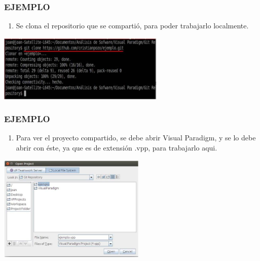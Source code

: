 \documentclass[8pt]{beamer}
\begin{document}
\begin{frame}
\frametitle{EJEMPLO}
\begin{enumerate}[19. ]
    \item Se clona el repositorio que se compartió, para poder trabajarlo localmente.\\
\end{enumerate}
\begin{center}
\includegraphics[width=8cm]{img/b30}\\
\fontsize{6}{1}
\end{center}
\end{frame}

\begin{frame}
\frametitle{EJEMPLO}
\begin{enumerate}[20. ]
	\justifying
    \item Para ver el proyecto compartido, se debe abrir Visual Paradigm, y se lo debe abrir con éste, ya que es de extensión .vpp, para trabajarlo aqui.\\
\end{enumerate}
\begin{center}
\includegraphics[width=7cm]{img/b31}\\
\fontsize{6}{1}
\end{center}
\end{frame}
\end{document}
